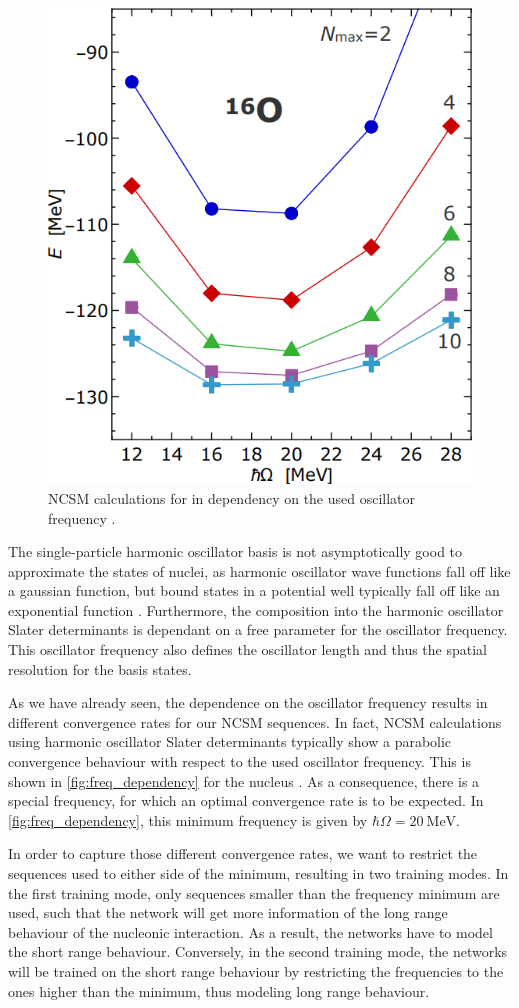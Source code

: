 \begin{figure}
  \includegraphics[width=.5\textwidth]{media/freq_filter.png}
  \caption{NCSM calculations for  in dependency on the used oscillator frequency \cite{sommerschule}.}
  \label{fig:freq_dependency}
\end{figure}
The single-particle harmonic oscillator basis is not asymptotically good to approximate the states of nuclei, as harmonic oscillator wave functions fall off like a gaussian function, but bound states in a potential well typically fall off like an exponential function \cite{sommerschule}. Furthermore, the composition into the harmonic oscillator Slater determinants is dependant on a free parameter for the oscillator frequency. This oscillator frequency also defines the oscillator length and thus the spatial resolution for the basis states.

As we have already seen, the dependence on the oscillator frequency results in different convergence rates for our NCSM sequences. In fact, NCSM calculations using harmonic oscillator Slater determinants typically show a parabolic convergence behaviour with respect to the used oscillator frequency. This is shown in \autoref{fig:freq_dependency} for the nucleus . As a consequence, there is a special frequency, for which an optimal convergence rate is to be expected. In \autoref{fig:freq_dependency}, this minimum frequency is given by $\hbar \Omega = \SI{20}{\mega\electronvolt}$.

In order to capture those different convergence rates, we want to restrict the sequences used to either side of the minimum, resulting in two training modes. In the first training mode, only sequences smaller than the frequency minimum are used, such that the network will get more information of the long range behaviour of the nucleonic interaction. As a result, the networks have to model the short range behaviour. Conversely, in the second training mode, the networks will be trained on the short range behaviour by restricting the frequencies to the ones higher than the minimum, thus modeling long range behaviour.

